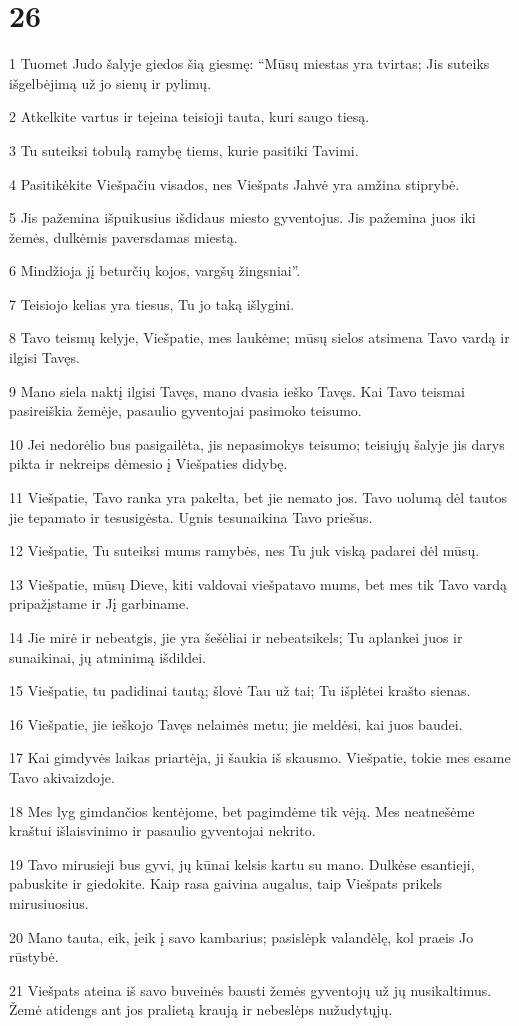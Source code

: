\chapter{26}


\par 1 Tuomet Judo šalyje giedos šią giesmę: “Mūsų miestas yra tvirtas; Jis suteiks išgelbėjimą už jo sienų ir pylimų. 
\par 2 Atkelkite vartus ir teįeina teisioji tauta, kuri saugo tiesą. 
\par 3 Tu suteiksi tobulą ramybę tiems, kurie pasitiki Tavimi. 
\par 4 Pasitikėkite Viešpačiu visados, nes Viešpats Jahvė yra amžina stiprybė. 
\par 5 Jis pažemina išpuikusius išdidaus miesto gyventojus. Jis pažemina juos iki žemės, dulkėmis paversdamas miestą. 
\par 6 Mindžioja jį beturčių kojos, vargšų žingsniai”. 
\par 7 Teisiojo kelias yra tiesus, Tu jo taką išlygini. 
\par 8 Tavo teismų kelyje, Viešpatie, mes laukėme; mūsų sielos atsimena Tavo vardą ir ilgisi Tavęs. 
\par 9 Mano siela naktį ilgisi Tavęs, mano dvasia ieško Tavęs. Kai Tavo teismai pasireiškia žemėje, pasaulio gyventojai pasimoko teisumo. 
\par 10 Jei nedorėlio bus pasigailėta, jis nepasimokys teisumo; teisiųjų šalyje jis darys pikta ir nekreips dėmesio į Viešpaties didybę. 
\par 11 Viešpatie, Tavo ranka yra pakelta, bet jie nemato jos. Tavo uolumą dėl tautos jie tepamato ir tesusigėsta. Ugnis tesunaikina Tavo priešus. 
\par 12 Viešpatie, Tu suteiksi mums ramybės, nes Tu juk viską padarei dėl mūsų. 
\par 13 Viešpatie, mūsų Dieve, kiti valdovai viešpatavo mums, bet mes tik Tavo vardą pripažįstame ir Jį garbiname. 
\par 14 Jie mirė ir nebeatgis, jie yra šešėliai ir nebeatsikels; Tu aplankei juos ir sunaikinai, jų atminimą išdildei. 
\par 15 Viešpatie, tu padidinai tautą; šlovė Tau už tai; Tu išplėtei krašto sienas. 
\par 16 Viešpatie, jie ieškojo Tavęs nelaimės metu; jie meldėsi, kai juos baudei. 
\par 17 Kai gimdyvės laikas priartėja, ji šaukia iš skausmo. Viešpatie, tokie mes esame Tavo akivaizdoje. 
\par 18 Mes lyg gimdančios kentėjome, bet pagimdėme tik vėją. Mes neatnešėme kraštui išlaisvinimo ir pasaulio gyventojai nekrito. 
\par 19 Tavo mirusieji bus gyvi, jų kūnai kelsis kartu su mano. Dulkėse esantieji, pabuskite ir giedokite. Kaip rasa gaivina augalus, taip Viešpats prikels mirusiuosius. 
\par 20 Mano tauta, eik, įeik į savo kambarius; pasislėpk valandėlę, kol praeis Jo rūstybė. 
\par 21 Viešpats ateina iš savo buveinės bausti žemės gyventojų už jų nusikaltimus. Žemė atidengs ant jos pralietą kraują ir nebeslėps nužudytųjų.



